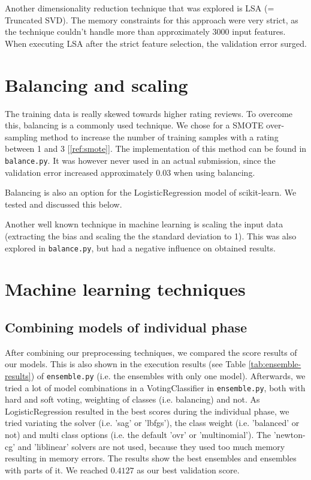 \documentclass[a4paper,12pt]{article}
\begin{document}
Another dimensionality reduction technique that was explored is LSA (= Truncated SVD). The memory constraints for this approach were very strict, as the technique couldn't handle more than approximately 3000 input features. When executing LSA after the strict feature selection, the validation error surged.

\section{Balancing and scaling}
The training data is really skewed towards higher rating reviews. To overcome this, balancing is a commonly used technique. We chose for a SMOTE over-sampling method to increase the number of training samples with a rating between 1 and 3 [\ref{ref:smote}]. The implementation of this method can be found in  \texttt{balance.py}. It was however never used in an actual submission, since the validation error increased approximately $0.03$ when using balancing.

Balancing is also an option for the LogisticRegression model of scikit-learn. We tested and discussed this below.

Another well known technique in machine learning is scaling the input data (extracting the bias and scaling the the standard deviation to 1). This was also explored in \texttt{balance.py}, but had a negative influence on obtained results.

\section{Machine learning techniques}

\subsection{Combining models of individual phase}

After combining our preprocessing techniques, we compared the score results of our models. This is also shown in the execution results (see Table \ref{tab:ensemble-results}) of \texttt{ensemble.py} (i.e. the ensembles with only one model). Afterwards, we tried a lot of model combinations in a VotingClassifier in \texttt{ensemble.py}, both with hard and soft voting, weighting of classes (i.e. balancing) and not. As LogisticRegression resulted in the best scores during the individual phase, we tried variating the solver (i.e. 'sag' or 'lbfgs'), the class weight (i.e. 'balanced' or not) and multi class options (i.e. the default 'ovr' or 'multinomial'). The 'newton-cg' and 'liblinear' solvers are not used, because they used too much memory resulting in memory errors. The results show the best ensembles and ensembles with parts of it. We reached $0.4127$ as our best validation score.
\end{document}
